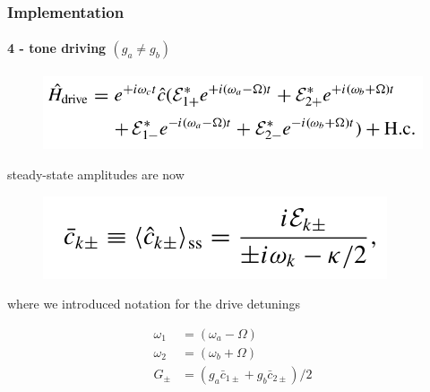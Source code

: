 \documentclass[aspectratio=43]{beamer}
\begin{document}
\begin{frame}
	
	\frametitle{Implementation}
	\framesubtitle{4 - tone driving $(g_{a} \neq g_{b})$}
	
	\begin{figure}
		\includegraphics[width = 8 cm]{plots/hamiltonian_4_tone.png}
	\end{figure}

	steady-state amplitudes are now

	\begin{figure}
		\includegraphics[width = 5 cm]{plots/ss_4_tone.png}
	\end{figure}

	where we introduced notation for the drive detunings

	\begin{align}
	\omega_{1} &= (\omega_{a} - \Omega) \nonumber \\
		\omega_{2} &= (\omega_{b} + \Omega) \nonumber \\
		G_{\pm} &= (g_{a}\bar{c}_{1\pm} + g_{b}\bar{c}_{2\pm}) / 2 \nonumber
	\end{align}

\end{frame}
\end{document}
